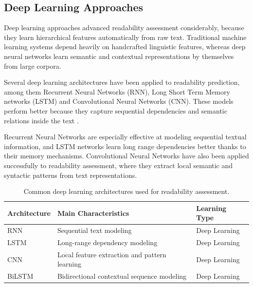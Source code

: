 \documentclass[12pt]{report}
\begin{document}
\subsection{Deep Learning Approaches}

Deep learning approaches advanced readability assessment considerably, because they learn hierarchical features automatically from raw text. Traditional machine learning systems depend heavily on handcrafted linguistic features, whereas deep neural networks learn semantic and contextual representations by themselves from large corpora.

Several deep learning architectures have been applied to readability prediction, among them Recurrent Neural Networks (RNN), Long Short Term Memory networks (LSTM) and Convolutional Neural Networks (CNN). These models perform better because they capture sequential dependencies and semantic relations inside the text \cite{martinc2021supervised}.

Recurrent Neural Networks are especially effective at modeling sequential textual information, and LSTM networks learn long range dependencies better thanks to their memory mechanisms. Convolutional Neural Networks have also been applied successfully to readability assessment, where they extract local semantic and syntactic patterns from text representations.

\begin{table}[H]

\centering

\caption{Common deep learning architectures used for readability assessment.}

\label{tab:deep_learning_readability}

\begin{tabular}{p{4cm} p{7cm} p{2.5cm}}

\toprule

\textbf{Architecture} & \textbf{Main Characteristics} & \textbf{Learning Type} \\

\midrule

RNN & Sequential text modeling & Deep Learning \\

LSTM & Long-range dependency modeling & Deep Learning \\

CNN & Local feature extraction and pattern learning & Deep Learning \\

BiLSTM & Bidirectional contextual sequence modeling & Deep Learning \\

\bottomrule

\end{tabular}

\end{table}
\end{document}
